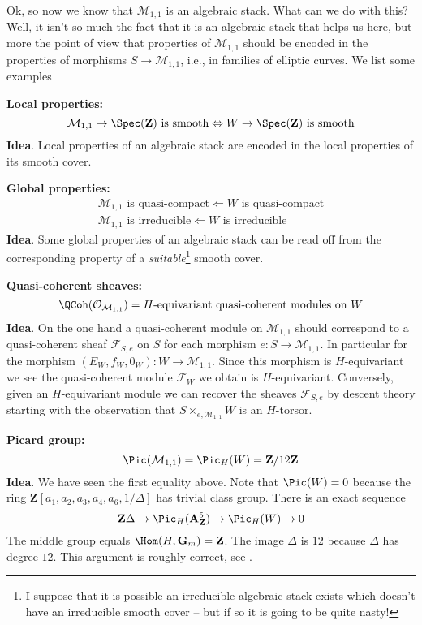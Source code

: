 \noindent
Ok, so now we know that $\mathcal{M}_{1, 1}$ is an algebraic
stack. What can we do with this? Well, it isn't so much the fact that it
is an algebraic stack that helps us here, but more the point of view that
properties of $\mathcal{M}_{1, 1}$ should be encoded in the properties
of morphisms $S \to \mathcal{M}_{1, 1}$, i.e., in families of elliptic
curves. We list some examples

\medskip\noindent
{\bf Local properties:}
$$
\mathcal{M}_{1, 1} \to \Spec(\mathbf{Z})\text{ is smooth}
\Leftrightarrow
W \to \Spec(\mathbf{Z})\text{ is smooth}
$$
{\bf Idea}. Local properties of an algebraic stack are encoded in the local
properties of its smooth cover.

\medskip\noindent
{\bf Global properties:}
$$
\begin{matrix}
\mathcal{M}_{1, 1}\text{ is quasi-compact} \Leftarrow W\text{ is quasi-compact}
\\
\mathcal{M}_{1, 1}\text{ is irreducible} \Leftarrow W\text{ is irreducible}
\end{matrix}
$$
{\bf Idea}. Some global properties of an algebraic stack can be read off
from the corresponding property of a {\it suitable}\footnote{I suppose that
it is possible an irreducible algebraic stack exists which doesn't have an
irreducible smooth cover -- but if so it is going to be quite nasty!}
smooth cover.

\medskip\noindent
{\bf Quasi-coherent sheaves:}
$$
\QCoh(\mathcal{O}_{\mathcal{M}_{1, 1}}) =
H\text{-equivariant quasi-coherent modules on }W
$$
{\bf Idea}. On the one hand a quasi-coherent module on $\mathcal{M}_{1, 1}$
should correspond to a quasi-coherent sheaf $\mathcal{F}_{S, e}$ on $S$
for each morphism $e : S \to \mathcal{M}_{1, 1}$. In particular for the
morphism $(E_W, f_W, 0_W) :  W \to \mathcal{M}_{1, 1}$. Since this morphism is
$H$-equivariant we see the quasi-coherent module $\mathcal{F}_W$ we obtain is
$H$-equivariant. Conversely, given an $H$-equivariant module we can recover
the  sheaves $\mathcal{F}_{S, e}$ by descent theory starting with the
observation that $S \times_{e, \mathcal{M}_{1, 1}} W$ is an $H$-torsor.

\medskip\noindent
{\bf Picard group:}
$$
\Pic(\mathcal{M}_{1, 1}) = \Pic_H(W) = \mathbf{Z}/12\mathbf{Z}
$$
{\bf Idea}. We have seen the first equality above. Note that
$\Pic(W) = 0$ because the ring
$\mathbf{Z}[a_1, a_2, a_3, a_4, a_6, 1/\Delta]$
has trivial class group.
There is an exact sequence
$$
\mathbf{Z}\Delta \to
\Pic_H(\mathbf{A}^5_{\mathbf{Z}}) \to
\Pic_H(W) \to 0
$$
The middle group equals $\Hom(H, \mathbf{G}_m) = \mathbf{Z}$.
The image $\Delta$ is $12$ because $\Delta$ has degree $12$.
This argument is roughly correct, see \cite{PicM11}.

